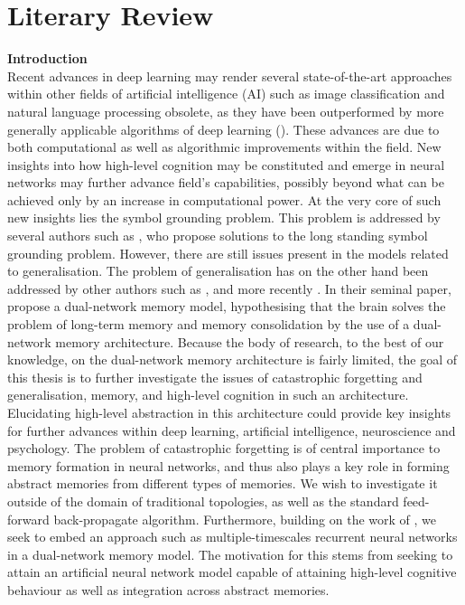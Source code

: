 
\chapter{Literary Review}
\textbf{Introduction}
\\
Recent advances in deep learning may render several state-of-the-art approaches within other fields of artificial intelligence (AI) such as image classification and natural language processing obsolete, as they have been outperformed by more generally applicable algorithms of deep learning (\cite{LeCun2015, Schmidhuber2014}). These advances are due to both computational as well as algorithmic improvements within the field. New insights into how high-level cognition may be constituted and emerge in neural networks may further advance field's capabilities, possibly beyond what can be achieved only by an increase in computational power. At the very core of such new insights lies the symbol grounding problem. This problem is addressed by several authors such as \cite{Yamashita2008, Tani2014}, who propose solutions to the long standing symbol grounding problem. However, there are still issues present in the models related to generalisation. The problem of generalisation has on the other hand been addressed by other authors such as \cite{McClelland1995}, and more recently \cite{Hattori2014}. In their seminal paper, \cite{McClelland1995} propose a dual-network memory model, hypothesising that the brain solves the problem of long-term memory and memory consolidation by the use of a dual-network memory architecture. Because the body of research, to the best of our knowledge, on the dual-network memory architecture is fairly limited, the goal of this thesis is to further investigate the issues of catastrophic forgetting and generalisation, memory, and high-level cognition in such an architecture. Elucidating high-level abstraction in this architecture could provide key insights for further advances within deep learning, artificial intelligence, neuroscience and psychology. The problem of catastrophic forgetting is of central importance to memory formation in neural networks, and thus also plays a key role in forming abstract memories from different types of memories. We wish to investigate it outside of the domain of traditional topologies, as well as the standard feed-forward back-propagate algorithm. Furthermore, building on the work of \cite{Hattori2014}, we seek to embed an approach such as multiple-timescales recurrent neural networks in a dual-network memory model. The motivation for this stems from seeking to attain an artificial neural network model capable of attaining high-level cognitive behaviour as well as integration across abstract memories.
